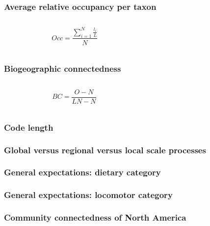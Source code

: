 \documentclass{beamer}
\begin{document}
\begin{frame}
  \frametitle{Average relative occupancy per taxon}

  \begin{columns}
    \begin{column}{0.5\textwidth}
      \begin{equation}
        Occ = \frac{\sum_{i = 1}^{N} \frac{l_{i}}{L}}{N}
        \label{eq:occ}
      \end{equation}
    \end{column}
    \begin{column}{0.5\textwidth}
    \end{column}
  \end{columns}
\end{frame}

\begin{frame}
  \frametitle{Biogeographic connectedness}

  \begin{columns}
    \begin{column}{0.5\textwidth}
      \begin{equation}
        BC = \frac{O - N}{LN - N}
        \label{eq:bc}
      \end{equation}
    \end{column}
    \begin{column}{0.5\textwidth}
    \end{column}
  \end{columns}
\end{frame}

\begin{frame}
  \frametitle{Code length}

\end{frame}

\begin{frame}
  \frametitle{Global versus regional versus local scale processes}
\end{frame}

\begin{frame}
  \frametitle{General expectations: dietary category}
\end{frame}

\begin{frame}
  \frametitle{General expectations: locomotor category}
\end{frame}

\begin{frame}
  \frametitle{Community connectedness of North America}
\end{frame}
\end{document}
